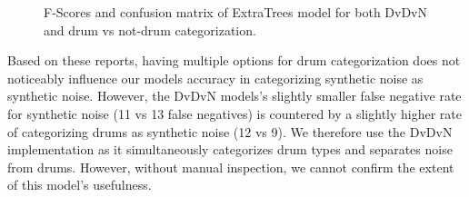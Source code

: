 \documentclass[\main/thesis.tex]{subfiles}
\begin{document}
\begin{figure}[htbp!]
\begin{center}
\end{center}


\caption{F-Scores and confusion matrix of ExtraTrees model for both DvDvN and drum vs not-drum categorization.}
\label{fig:conf_f1}
\end{figure}

Based on these reports, having multiple options for drum categorization does not noticeably influence our models accuracy in categorizing synthetic noise as synthetic noise. However, the DvDvN models's slightly smaller false negative rate for synthetic noise (11 vs 13 false negatives) is countered by a slightly higher rate of categorizing drums as synthetic noise (12 vs 9).  We therefore use the DvDvN implementation as it simultaneously categorizes drum types and separates noise from drums. However, without manual inspection, we cannot confirm the extent of this model's usefulness. 
\end{document}
